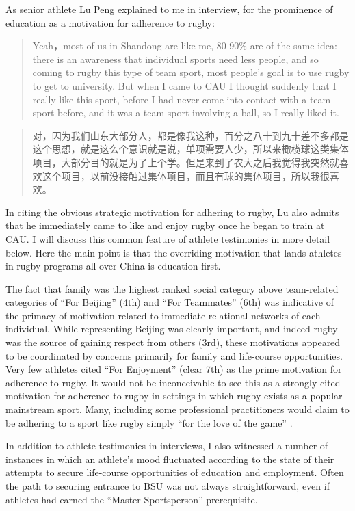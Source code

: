 \begin{CJK}{UTF8}{gbsn}
As senior athlete Lu Peng explained to me in interview, for the prominence of education as a motivation for adherence to rugby:
        \begin{quote}
            Yeah，most of us in Shandong are like me, 80-90\% are of the same idea: there is an awareness that individual sports need less people, and so coming to rugby this type of team sport, most people’s goal is to use rugby to get to university.  But when I came to CAU I thought suddenly that I really like this sport, before I had never come into contact with a team sport before, and it was a team sport involving a ball, so I really liked it.
        \end{quote}
        \begin{quote}
             对，因为我们山东大部分人，都是像我这种，百分之八十到九十差不多都是这个思想，就是这么个意识就是说，单项需要人少，所以来橄榄球这类集体项目，大部分目的就是为了上个学。但是来到了农大之后我觉得我突然就喜欢这个项目，以前没接触过集体项目，而且有球的集体项目，所以我很喜欢。
        \end{quote}

In citing the obvious strategic motivation for adhering to rugby, Lu also admits that he immediately came to like and enjoy rugby once he began to train at CAU. I will discuss this common feature of athlete testimonies in more detail below. Here the main point is that the overriding motivation that lands athletes in rugby programs all over China is education first.

The fact that family was the highest ranked social category above team-related categories of ``For Beijing'' (4th) and ``For Teammates'' (6th) was indicative of the primacy of motivation related to immediate relational networks of each individual.  While representing Beijing was clearly important, and indeed rugby was the source of gaining respect from others (3rd), these motivations appeared to be coordinated by concerns primarily for family and life-course opportunities.  Very few athletes cited ``For Enjoyment'' (clear 7th) as the prime motivation for adherence to rugby.  It would not be inconceivable to see this as a strongly cited motivation for adherence to rugby in settings in which rugby exists as a popular mainstream sport.  Many, including some professional practitioners would claim to be adhering to a sport like rugby simply ``for the love of the game'' \citep{Jackson1998}.






In addition to athlete testimonies in interviews, I also witnessed a number of instances in which an athlete's mood fluctuated according to the state of their attempts to secure life-course opportunities of education and employment. Often the path to securing entrance to BSU was not always straightforward, even if athletes had earned the ``Master Sportsperson'' prerequisite.


\end{CJK}
